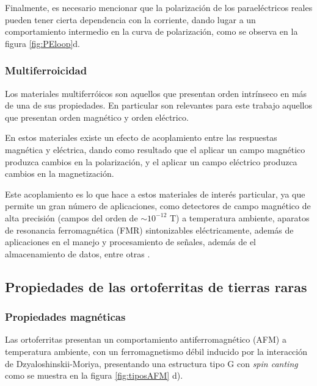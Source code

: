 \documentclass[../main.tex]{subfiles}
\begin{document}
Finalmente, es necesario mencionar que la polarización de los paraeléctricos reales pueden tener cierta dependencia con la corriente, dando lugar a un comportamiento intermedio en la curva de polarización, como se observa en la figura \ref{fig:PEloop}d.
\subsubsection{Multiferroicidad} \label{sec:multif}
Los materiales multiferróicos son aquellos que presentan orden intrínseco en más de una de sus propiedades. En particular son relevantes para este trabajo aquellos que presentan orden magnético y orden eléctrico.

En estos materiales existe un efecto de acoplamiento entre las respuestas magnética y eléctrica, dando como resultado que el aplicar un campo magnético produzca cambios en la polarización, y el aplicar un campo eléctrico produzca cambios en la magnetización.

Este acoplamiento es lo que hace a estos materiales de interés particular, ya que permite un gran número de aplicaciones, como detectores de campo magnético de alta precisión (campos del orden de $\sim10^{-12}$ T) a temperatura ambiente, aparatos de resonancia ferromagnética (FMR) sintonizables eléctricamente, además de aplicaciones en el manejo y procesamiento de señales, además de el almacenamiento de datos, entre otras \cite{Vopson2015}.
\subsection{Propiedades de las ortoferritas de tierras raras}
\subsubsection{Propiedades magnéticas}
Las ortoferritas  presentan un comportamiento antiferromagnético (AFM) a temperatura ambiente, con un ferromagnetismo débil inducido por la interacción de Dzyaloshinskii-Moriya, presentando una estructura tipo G con \textit{spin canting} como se muestra en la figura \ref{fig:tiposAFM} d).
\end{document}
